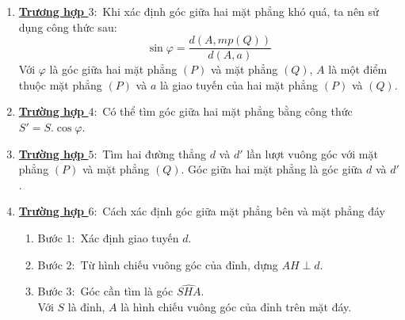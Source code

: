\begin{khung}
\begin{enumerate}
\begin{flushright}
				\end{flushright}
				\item \underline{\textbf{Trương hợp $3\colon$}} Khi xác định góc giữa hai mặt phẳng khó quá, ta nên sử dụng công thức sau$\colon$
				$$\sin\varphi =\dfrac{d\left( A,mp(Q)\right)}{d(A,a)}$$
				Với $\varphi$ là góc giữa hai mặt phẳng $(P)$ và mặt phẳng $(Q)$, $A$ là một điểm thuộc mặt phẳng $(P)$ và $a$ là giao tuyến của hai mặt phẳng $(P)$ và $(Q)$.
				\item \underline{\textbf{Trường hợp $4\colon$}} Có thể tìm góc giữa hai mặt phẳng bằng công thức $S' = S.\cos\varphi$.
				\item \underline{\textbf{Trường hợp $5\colon$}} Tìm hai đường thẳng $d$ và $d'$ lần lượt vuông góc với mặt phẳng $(P)$ và mặt phẳng $(Q)$. Góc giữa hai mặt phẳng là góc giữa $d$ và $d'$.
				\item \underline{\textbf{Trường hợp $6\colon$}} Cách xác định góc giữa mặt phẳng bên và mặt phẳng đáy
				\begin{enumerate}
					\item Bước $1\colon$ Xác định giao tuyến $d$.
					\item Bước $2\colon$ Từ hình chiếu vuông góc của đỉnh, dựng $AH \perp d$.
					\item Bước $3\colon$ Góc cần tìm là góc $\widehat{SHA}$.\\
					Với $S$ là đỉnh, $A$ là hình chiếu vuông góc của đỉnh trên mặt đáy.
				\end{enumerate}
			\end{enumerate}

\end{khung}
